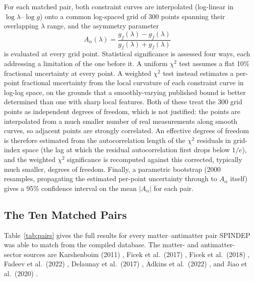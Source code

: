 \documentclass[main]{subfiles}
\begin{document}
For each matched pair, both constraint curves are interpolated (log-linear
in $\log\lambda$--$\log g$) onto a common log-spaced grid of 300 points
spanning their overlapping $\lambda$ range, and the asymmetry parameter
\begin{equation}
  A_\alpha(\lambda) = \frac{g_f(\lambda) - g_{\bar f}(\lambda)}{g_f(\lambda) + g_{\bar f}(\lambda)}
\end{equation}
is evaluated at every grid point. Statistical significance is assessed four
ways, each addressing a limitation of the one before it. A uniform
$\chi^2$ test assumes a flat 10\% fractional uncertainty at every point. A
weighted $\chi^2$ test instead estimates a per-point fractional uncertainty
from the local curvature of each constraint curve in log-log space, on the
grounds that a smoothly-varying published bound is better determined than
one with sharp local features. Both of these treat the 300 grid points as
independent degrees of freedom, which is not justified: the points are
interpolated from a much smaller number of real measurements along smooth
curves, so adjacent points are strongly correlated. An effective degrees of
freedom is therefore estimated from the autocorrelation length of the
$\chi^2$ residuals in grid-index space (the lag at which the residual
autocorrelation first drops below $1/e$), and the weighted $\chi^2$
significance is recomputed against this corrected, typically much smaller,
degrees of freedom. Finally, a parametric bootstrap (2000 resamples,
propagating the estimated per-point uncertainty through to $A_\alpha$
itself) gives a 95\% confidence interval on the mean $|A_\alpha|$ for each
pair.

\subsection{The Ten Matched Pairs}

Table~\ref{tab:pairs} gives the full results for every matter--antimatter
pair SPINDEP was able to match from the compiled database. The matter- and
antimatter-sector sources are Karshenboim (2011) \cite{Karshenboim2011},
Ficek et al.\ (2017) \cite{Ficek2017}, Ficek et al.\ (2018)
\cite{Ficek2018}, Fadeev et al.\ (2022) \cite{Fadeev2022}, Delaunay et al.\
(2017) \cite{Delaunay2017}, Adkins et al.\ (2022) \cite{Adkins2022}, and
Jiao et al.\ (2020) \cite{Jiao2019}.
\end{document}
